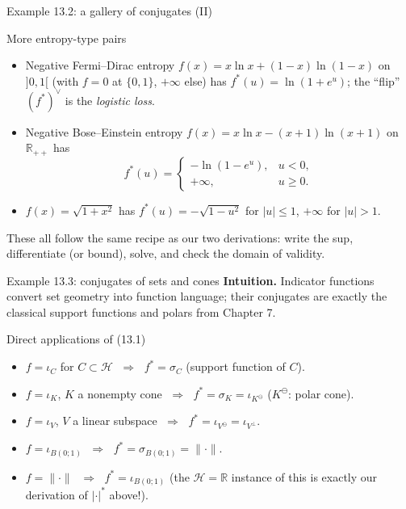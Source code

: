 \documentclass[aspectratio=169,10pt]{beamer}
\newcommand{\R}{\mathbb{R}}
\newcommand{\Hil}{\mathcal{H}}
\newcommand{\norm}[1]{\lVert #1 \rVert}
\newcommand{\iotaC}{\iota_C}
\newcommand{\sigmaC}{\sigma_C}
\newcommand{\conj}[1]{#1^{*}}
\begin{document}
\begin{frame}{Example 13.2: a gallery of conjugates (II)}
  \begin{block}{More entropy-type pairs}
    \begin{itemize}
      \item Negative Fermi--Dirac entropy
        $f(x)=x\ln x+(1-x)\ln(1-x)$ on $]0,1[$ (with $f=0$ at $\{0,1\}$,
        $+\infty$ else) has $\conj f(u)=\ln(1+e^u)$; the ``flip''
        $(\conj f)^{\vee}$ is the \emph{logistic loss}.
      \item Negative Bose--Einstein entropy
        $f(x)=x\ln x-(x+1)\ln(x+1)$ on $\R_{++}$ has
        \[
          \conj f(u) = \begin{cases} -\ln(1-e^u), & u<0,\\ +\infty, & u\ge 0.\end{cases}
        \]
      \item $f(x)=\sqrt{1+x^2}$ has $\conj f(u) = -\sqrt{1-u^2}$ for
        $|u|\le1$, $+\infty$ for $|u|>1$.
    \end{itemize}
  \end{block}
  These all follow the same recipe as our two derivations: write the sup,
  differentiate (or bound), solve, and check the domain of validity.
\end{frame}

\begin{frame}{Example 13.3: conjugates of sets and cones}
  \textbf{Intuition.} Indicator functions convert set geometry into
  function language; their conjugates are exactly the classical support
  functions and polars from Chapter 7.
  \begin{block}{Direct applications of (13.1)}
    \begin{itemize}
      \item $f=\iotaC$ for $C\subset\Hil$ $\;\Longrightarrow\;$
        $\conj f = \sigmaC$ (support function of $C$).
      \item $f=\iota_K$, $K$ a nonempty cone $\;\Longrightarrow\;$
        $\conj f = \sigma_K = \iota_{K^{\ominus}}$ ($K^{\ominus}$: polar
        cone).
      \item $f=\iota_V$, $V$ a linear subspace $\;\Longrightarrow\;$
        $\conj f = \iota_{V^{\ominus}} = \iota_{V^{\perp}}$.
      \item $f=\iota_{B(0;1)}$ $\;\Longrightarrow\;$
        $\conj f = \sigma_{B(0;1)} = \norm{\cdot}$.
      \item $f=\norm{\cdot}$ $\;\Longrightarrow\;$ $\conj f = \iota_{B(0;1)}$
        (the $\Hil=\R$ instance of this is exactly our derivation of
        $\conj{|\cdot|}$ above!).
    \end{itemize}
  \end{block}
\end{frame}
\end{document}
